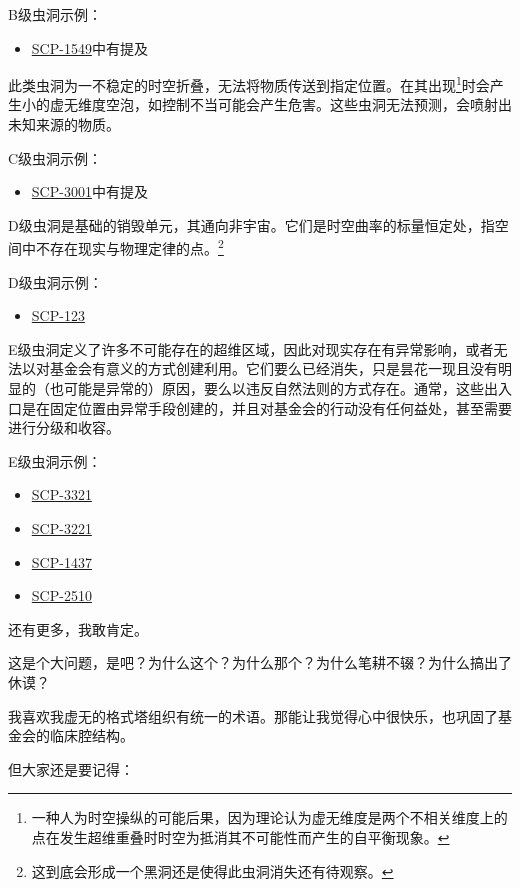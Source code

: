 B级虫洞示例：

\begin{itemize}
\item \hyperref[chap:SCP-1549]{SCP-1549}中有提及
\end{itemize}


此类虫洞为一不稳定的时空折叠，无法将物质传送到指定位置。在其出现\footnote{一种人为时空操纵的可能后果，因为理论认为虚无维度是两个不相关维度上的点在发生超维重叠时时空为抵消其不可能性而产生的自平衡现象。}时会产生小的虚无维度空泡，如控制不当可能会产生危害。这些虫洞无法预测，会喷射出未知来源的物质。

C级虫洞示例：

\begin{itemize}
\item \hyperref[chap:SCP-3001]{SCP-3001}中有提及
\end{itemize}


D级虫洞是基础的销毁单元，其通向非宇宙。它们是时空曲率的标量恒定处，指空间中不存在现实与物理定律的点。\footnote{这到底会形成一个黑洞还是使得此虫洞消失还有待观察。}

D级虫洞示例：

\begin{itemize}
\item \hyperref[chap:SCP-123]{SCP-123}
\end{itemize}


E级虫洞定义了许多不可能存在的超维区域，因此对现实存在有异常影响，或者无法以对基金会有意义的方式创建利用。它们要么已经消失，只是昙花一现且没有明显的（也可能是异常的）原因，要么以违反自然法则的方式存在。通常，这些出入口是在固定位置由异常手段创建的，并且对基金会的行动没有任何益处，甚至需要进行分级和收容。

E级虫洞示例：

\begin{itemize}
\item \hyperref[chap:SCP-3321]{SCP-3321}
\item \hyperref[chap:SCP-3221]{SCP-3221}
\item \hyperref[chap:SCP-1437]{SCP-1437}
\item \hyperref[chap:SCP-2510]{SCP-2510}
\end{itemize}

还有更多，我敢肯定。


这是个大问题，是吧？为什么这个？为什么那个？为什么笔耕不辍？为什么搞出了休谟？

我喜欢我虚无的格式塔组织有统一的术语。那能让我觉得心中很快乐，也巩固了基金会的临床腔结构。

但大家还是要记得：

